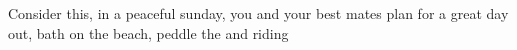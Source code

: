 Consider this, in a peaceful sunday, you and your best mates plan for a great day out, bath on the beach, peddle the and riding 